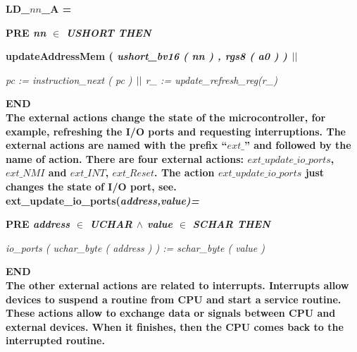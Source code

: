 \documentclass[a4paper]{llncs}
\begin{document}
\bf LD\_\(nn\)\_A  \rm =

\hspace*{0.20in}\bf PRE \it nn $\in$ \it USHORT\hspace*{0.15in} %
\bf THEN

\hspace*{0.20in}\bf updateAddressMem \rm ( \it ushort\_bv16 \rm ( \it nn \rm ) \rm , \it rgs8 \rm ( \it a0 \rm )
\rm )  $\mbox{$\mid\mid$}$

\hspace*{0.20in}\it pc \rm := \it instruction\_next \rm ( \it pc \rm )  $\mbox{$\mid\mid$}$  \it r\_ \rm := \it update\_refresh\_reg\rm (\it r\_\rm )

\hspace*{0.00in}\bf END\rm 
\\

The external actions change the state of the microcontroller, for
example, refreshing the I/O ports and requesting interruptions. The
external actions are named with the prefix ``$ext\_$'' and followed by
the name of action. There are four external actions: $ext\_update\_io\_ports$, $ext\_NMI$ and
$ext\_INT$, $ext\_Reset$. The action $ext\_update\_io\_ports$
just changes the state of I/O port,  see. \\


\hspace*{0.00in}\bf ext\_update\_io\_ports\rm (\it address\rm ,\it value\rm )\rm =

\hspace*{0.20in}\bf PRE \it address  $\in$  \it UCHAR  $\land$ \hspace*{0.10in}\it value  $\in$  \it SCHAR \bf THEN

\hspace*{0.20in}\it io\_ports \rm ( \it uchar\_byte \rm ( \it address \rm ) \rm ) \rm := \it schar\_byte \rm ( \it
value \rm )

\hspace*{0.00in}\bf END\rm
\\

The other external actions are related to interrupts. Interrupts allow
devices to suspend a routine from CPU and start a service routine.
These actions allow to exchange data or signals between CPU and external
devices. When it finishes, then the CPU comes back to the interrupted
routine. 
\end{document}
